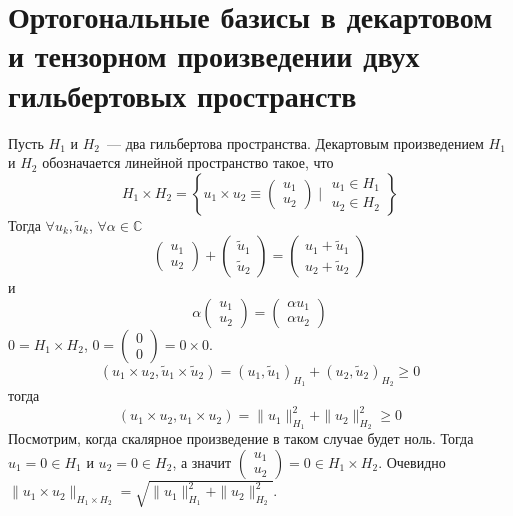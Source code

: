 \documentclass[14pt]{extarticle}
\begin{document}
\section*{Ортогональные базисы в декартовом и тензорном произведении двух 
гильбертовых пространств}
Пусть $H_1$ и $H_2$~--- два гильбертова пространства.
Декартовым произведением $H_1$ и $H_2$ обозначается линейной пространство
такое, что
$$
H_1 \times H_2 = \left\{
    u_1 \times u_2 \equiv \left(
    \begin{array}{c}
    u_1\\
    u_2
    \end{array}\right)
    \mid
    \begin{array}{c}
    u_1 \in H_1\\
    u_2 \in H_2
    \end{array}
    \right\}
$$
Тогда $\forall u_k, \tilde{u}_k$, $\forall \alpha \in \mathbb C$
$$
\left(
\begin{array}{c}
    u_1\\
    u_2
\end{array}
\right)
+
\left(
\begin{array}{c}
    \tilde{u}_1\\
    \tilde{u}_2
\end{array}
\right)
=
\left(
\begin{array}{c}
    u_1 + \tilde{u}_1\\
    u_2 + \tilde{u}_2
\end{array}
\right)
$$
и
$$
\alpha
\left(
\begin{array}{c}
    u_1\\
    u_2
\end{array}
\right)
=
\left(
\begin{array}{c}
    \alpha u_1\\
    \alpha u_2
\end{array}
\right)
$$
$0 = H_1 \times H_2$, $0 = \left(\begin{array}{c}
0\\
0
\end{array}\right) = 0 \times 0$.
$$
(u_1 \times u_2, \tilde{u}_1 \times \tilde{u}_2) = (u_1, \tilde{u}_1)_{H_1} + (u_2, \tilde{u}_2)
_{H_2} \ge 0
$$
тогда 
$$
(u_1 \times u_2, u_1 \times u_2) = \|u_1\|^2_{H_1} + \|u_2\|^2_{H_2} \ge 0
$$
Посмотрим, когда скалярное произведение в таком случае будет ноль.
Тогда $u_1 = 0 \in H_1$ и $u_2 = 0 \in H_2$, а значит $\left(\begin{array}{c}
    u_1\\
    u_2
\end{array}
\right) = 0 \in H_1 \times H_2$.
Очевидно $\|u_1 \times u_2\|_{H_1 \times H_2} = \sqrt{\|u_1\|^2_{H_1} + \|u_2\|^2_{H_2}}
$.
\end{document}
